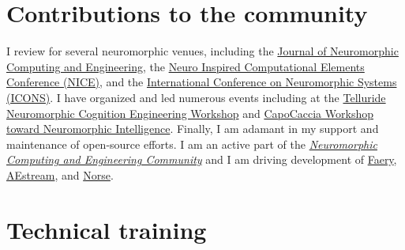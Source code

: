 \documentclass[11pt, a4paper]{article}
\newcommand{\years}[1]{\marginnote{\scriptsize #1}}
\begin{document}
\section*{Contributions to the community}
I review for several neuromorphic venues, including the \href{https://iopscience.iop.org/journal/2634-4386}{Journal of Neuromorphic Computing and Engineering}, the \href{https://niceworkshop.org/}{Neuro Inspired Computational Elements Conference (NICE)}, and the \href{https://iconsneuromorphic.cc/}{International Conference on Neuromorphic Systems (ICONS)}.
I have organized and led numerous events including at the \href{https://sites.google.com/view/telluride-2024/}{Telluride Neuromorphic Cognition Engineering Workshop} and \href{https://capocaccia.cc/en/}{CapoCaccia Workshop toward Neuromorphic Intelligence}.
Finally, I am adamant in my support and maintenance of open-source efforts.
I am an active part of the \emph{\href{https://open-neuromorphic.org/}{Neuromorphic Computing and Engineering Community}} and I am
driving development of \href{https://github.com/aestream/faery}{Faery}, \href{https://github.com/aestream}{AEstream}, and \href{https://github.com/norse/}{Norse}.

\section*{Technical training}
\end{document}
